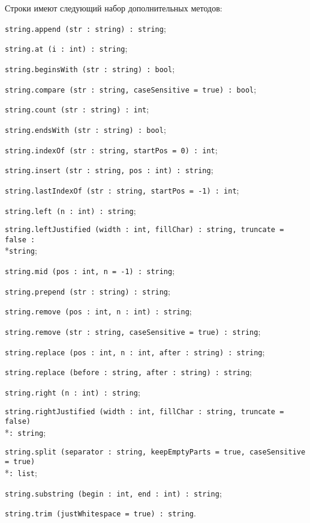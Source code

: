 Строки имеют следующий набор дополнительных методов:
\begin{icItems}
\item
    \texttt{string.append (str : string) : string};
\item
    \texttt{string.at (i : int) : string};
\item
    \texttt{string.beginsWith (str : string) : bool};
\item
    \texttt{string.compare (str : string, caseSensitive = true) : bool};
\item
    \texttt{string.count (str : string) : int};
\item
    \texttt{string.endsWith (str : string) : bool};
\item
    \texttt{string.indexOf (str : string, startPos = 0) : int};
\item
    \texttt{string.insert (str : string, pos : int) : string};
\item
    \texttt{string.lastIndexOf (str : string, startPos = -1) : int};
\item
    \texttt{string.left (n : int) : string};
\item
    \texttt{string.leftJustified (width : int, fillChar) : string, truncate = false :}\\*\texttt{string};
\item
    \texttt{string.mid (pos : int, n = -1) : string};
\item
    \texttt{string.prepend (str : string) : string};
\item
    \texttt{string.remove (pos : int, n : int) : string};
\item
    \texttt{string.remove (str : string, caseSensitive = true) : string};
\item
    \texttt{string.replace (pos : int, n : int, after : string) : string};
\item
    \texttt{string.replace (before : string, after : string) : string};
\item
    \texttt{string.right (n : int) : string};
\item
    \texttt{string.rightJustified (width : int, fillChar : string, truncate = false)}\\*\texttt{: string};
\item
    \texttt{string.split (separator : string, keepEmptyParts = true, caseSensitive = true)}\\*\texttt{: list};
\item
    \texttt{string.substring (begin : int, end : int) : string};
\item
    \texttt{string.trim (justWhitespace = true) : string}.
\end{icItems}

